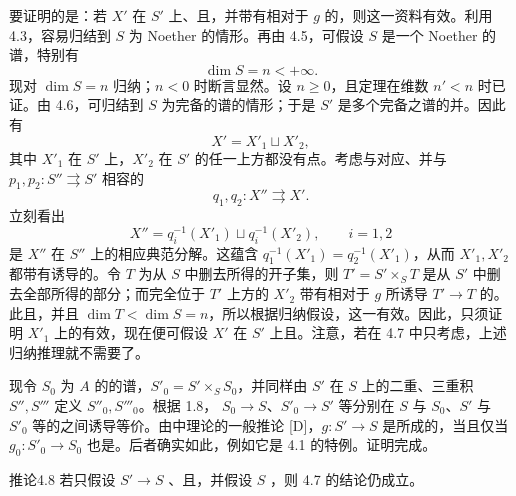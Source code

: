 要证明的是：若 $X'$ 在 $S'$ 上、且，并带有相对于 $g$ 的，则这一资料有效。利用 4.3，容易归结到 $S$ 为 Noether 的情形。再由 4.5，可假设 $S$ 是一个 Noether 的谱，特别有
\[
\dim S=n<+\infty.
\]
现对 $\dim S=n$ 归纳；$n<0$ 时断言显然。设 $n\geq0$，且定理在维数 $n'<n$ 时已证。由 4.6，可归结到 $S$ 为完备的谱的情形；于是 $S'$ 是多个完备之谱的并。因此有
\[
X'=X'_1\sqcup X'_2,
\]
其中 $X'_1$ 在 $S'$ 上，$X'_2$ 在 $S'$ 的任一上方都没有点。考虑与对应、并与 $p_1,p_2:S''\rightrightarrows S'$ 相容的
\[
q_1,q_2:X''\rightrightarrows X'.
\]
立刻看出
\[
X''=q_i^{-1}(X'_1)\sqcup q_i^{-1}(X'_2),\qquad i=1,2
\]
是 $X''$ 在 $S''$ 上的相应典范分解。这蕴含 $q_1^{-1}(X'_1)=q_2^{-1}(X'_1)$，从而 $X'_1,X'_2$ 都带有诱导的。令 $T$ 为从 $S$ 中删去所得的开子集，则 $T'=S'\times_S T$ 是从 $S'$ 中删去全部所得的部分；而完全位于 $T'$ 上方的 $X'_2$ 带有相对于 $g$ 所诱导 $T'\to T$ 的。此且，并且 $\dim T<\dim S=n$，所以根据归纳假设，这一有效。因此，只须证明 $X'_1$ 上的有效，现在便可假设 $X'$ 在 $S'$ 上且。注意，若在 4.7 中只考虑，上述归纳推理就不需要了。

现令 $S_0$ 为 $A$ 的的谱，$S'_0=S'\times_S S_0$，并同样由 $S'$ 在 $S$ 上的二重、三重积 $S'',S'''$ 定义 $S''_0,S'''_0$。根据 1.8， $S_0\to S$、$S'_0\to S'$ 等分别在 $S$ 与 $S_0$、$S'$ 与 $S'_0$ 等的之间诱导等价。由中理论的一般推论 [D]，$g:S'\to S$ 是所成的，当且仅当 $g_0:S'_0\to S_0$ 也是。后者确实如此，例如它是 4.1 的特例。证明完成。
\begin{SGAresult}{推论}{4.8}
若只假设 $S'\to S$ 、且，并假设 $S$ ，则 4.7 的结论仍成立。
\end{SGAresult}

